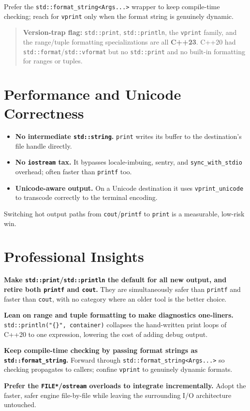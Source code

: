 Prefer the \lstinline|std::format_string<Args...>| wrapper to keep compile-time checking; reach for \lstinline|vprint| only when the format string is genuinely dynamic.

\begin{quote}
\textbf{Version-trap flag:} \lstinline|std::print|, \lstinline|std::println|, the \lstinline|vprint| family, and the range/tuple formatting specializations are all \textbf{C++23}. C++20 had \lstinline|std::format|/\lstinline|std::vformat| but no \lstinline|std::print| and no built-in formatting for ranges or tuples.
\end{quote}

\section{Performance and Unicode Correctness}

\begin{itemize}
    \item \textbf{No intermediate \lstinline|std::string|.} \lstinline|print| writes its buffer to the destination's file handle directly.
    \item \textbf{No \lstinline|iostream| tax.} It bypasses locale-imbuing, sentry, and \lstinline|sync_with_stdio| overhead; often faster than \lstinline|printf| too.
    \item \textbf{Unicode-aware output.} On a Unicode destination it uses \lstinline|vprint_unicode| to transcode correctly to the terminal encoding.
\end{itemize}

Switching hot output paths from \lstinline|cout|/\lstinline|printf| to \lstinline|print| is a measurable, low-risk win.

\section{Professional Insights}

\textbf{Make \lstinline|std::print|/\lstinline|std::println| the default for all new output, and retire both \lstinline|printf| and \lstinline|cout|.} They are simultaneously safer than \lstinline|printf| and faster than \lstinline|cout|, with no category where an older tool is the better choice.

\textbf{Lean on range and tuple formatting to make diagnostics one-liners.} \lstinline|std::println("{}", container)| collapses the hand-written print loops of C++20 to one expression, lowering the cost of adding debug output.

\textbf{Keep compile-time checking by passing format strings as \lstinline|std::format_string|.} Forward through \lstinline|std::format_string<Args...>| so checking propagates to callers; confine \lstinline|vprint| to genuinely dynamic formats.

\textbf{Prefer the \lstinline|FILE*|/\lstinline|ostream| overloads to integrate incrementally.} Adopt the faster, safer engine file-by-file while leaving the surrounding I/O architecture untouched.
